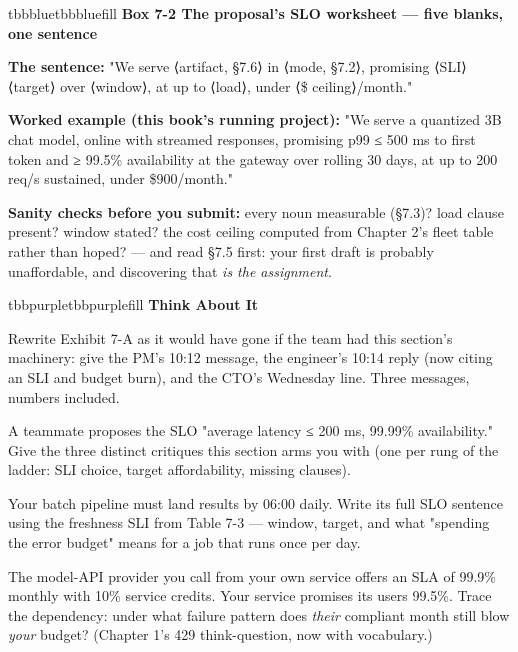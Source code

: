 \begin{calloutbox}{tbbblue}{tbbbluefill}
{\normalsize\bfseries\color{tbbblue}Box 7-2  The proposal's SLO worksheet — five blanks, one sentence}\par\vspace{3pt}
\textbf{The sentence:}  "We serve ⟨artifact, §7.6⟩ in ⟨mode, §7.2⟩, promising ⟨SLI⟩ ⟨target⟩ over ⟨window⟩, at up to ⟨load⟩, under ⟨\$ ceiling⟩/month."

\textbf{Worked example (this book's running project):}  "We serve a quantized 3B chat model, online with streamed responses, promising p99 ≤ 500 ms to first token and ≥ 99.5\% availability at the gateway over rolling 30 days, at up to 200 req/s sustained, under \$900/month."

\textbf{Sanity checks before you submit:} every noun measurable (§7.3)? load clause present? window stated? the cost ceiling computed from Chapter 2's fleet table rather than hoped? — and read §7.5 first: your first draft is probably unaffordable, and discovering that \textit{is the assignment}.
\end{calloutbox}

\vspace{3.0pt}

\begin{calloutbox}{tbbpurple}{tbbpurplefill}
{\normalsize\bfseries\color{tbbpurple}Think About It}\par\vspace{3pt}
\begin{tbbitemize}
  \item Rewrite Exhibit 7-A as it would have gone if the team had this section's machinery: give the PM's 10:12 message, the engineer's 10:14 reply (now citing an SLI and budget burn), and the CTO's Wednesday line. Three messages, numbers included.
  \item A teammate proposes the SLO "average latency ≤ 200 ms, 99.99\% availability." Give the three distinct critiques this section arms you with (one per rung of the ladder: SLI choice, target affordability, missing clauses).
  \item Your batch pipeline must land results by 06:00 daily. Write its full SLO sentence using the freshness SLI from Table 7-3 — window, target, and what "spending the error budget" means for a job that runs once per day.
  \item The model-API provider you call from your own service offers an SLA of 99.9\% monthly with 10\% service credits. Your service promises its users 99.5\%. Trace the dependency: under what failure pattern does \textit{their} compliant month still blow \textit{your} budget? (Chapter 1's 429 think-question, now with vocabulary.)
\end{tbbitemize}
\end{calloutbox}

